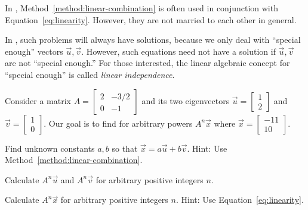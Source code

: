 \documentclass[../main.tex]{subfiles}
\begin{document}
\faStar{} In \thiscourse, Method~\ref{method:linear-combination} is often used in conjunction with Equation~\ref{eq:linearity}. However, they are not married to each other in general. 

{\footnotesize \faExclamationTriangle{} In \thiscourse{}, such problems will always have solutions, because we only deal with ``special enough'' vectors \(\vec{u}, \vec{v}\). However, such equations need not have a solution if \(\vec{u}, \vec{v}\) are not ``special enough.'' For those interested, the linear algebraic concept for ``special enough'' is called \emph{linear independence}.}
\clearpage

Consider a matrix \(A = \begin{bmatrix} 2 & -3/2 \\ 0 & -1 \end{bmatrix}\) and its two eigenvectors \(\vec{u} = \begin{bmatrix} 1 \\ 2 \end{bmatrix}\) and \(\vec{v} = \begin{bmatrix} 1 \\ 0 \end{bmatrix}\).  Our goal is to find  for arbitrary powers \(A^{n} \vec{x}\) where \(\vec{x} = \begin{bmatrix} -11 \\ 10 \end{bmatrix}\).

\begin{example} \label{ex:linear-combination}
  Find unknown constants \(a,b\) so that \(\vec{x} = a \vec{u} + b \vec{v}\). Hint: Use Method~\ref{method:linear-combination}.

\end{example}

\begin{example} \label{ex:linearity-powers-eigen}
  Calculate \(A^{n} \vec{u}\) and \(A^{n} \vec{v}\) for arbitrary positive integers \(n\). 

\end{example}

\begin{example} \label{ex:linearity-powers-combination}
  Calculate \(A^{n} \vec{x}\) for arbitrary positive integers \(n\). Hint: Use Equation~\eqref{eq:linearity}.

  \blanks*
\end{example}
\clearpage
\end{document}
